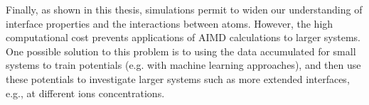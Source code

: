 Finally, as shown in this thesis, \abinitio simulations permit to widen our understanding of interface properties and the interactions between atoms.
However, the high computational cost prevents applications of AIMD calculations to larger systems.
One possible solution to this problem is to using the \abinitio data accumulated for small systems to train potentials (e.g. with machine learning approaches\cite{Norvig2010}), 
and then use these potentials to investigate larger systems such as more extended interfaces, 
e.g., at different ions concentrations\cite{Behler2007,Behler2011,Behler2014,Kolb2017}.
